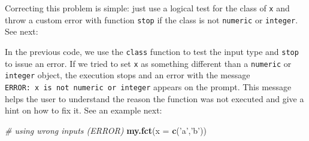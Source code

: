 \documentclass[11pt,]{book}
\newenvironment{Shaded}{\begin{snugshade}}{\end{snugshade}}
\newcommand{\KeywordTok}[1]{\textcolor[rgb]{0.27,0.27,0.27}{\textbf{#1}}}
\newcommand{\DataTypeTok}[1]{\textcolor[rgb]{0.27,0.27,0.27}{#1}}
\newcommand{\DecValTok}[1]{\textcolor[rgb]{0.06,0.06,0.06}{#1}}
\newcommand{\StringTok}[1]{\textcolor[rgb]{0.5,0.5,0.5}{#1}}
\newcommand{\CommentTok}[1]{\textcolor[rgb]{0.56,0.35,0.01}{\textit{#1}}}
\newcommand{\ControlFlowTok}[1]{\textcolor[rgb]{0.13,0.29,0.53}{\textbf{#1}}}
\newcommand{\OperatorTok}[1]{\textcolor[rgb]{0.81,0.36,0.00}{\textbf{#1}}}
\newcommand{\NormalTok}[1]{#1}
\begin{document}
Correcting this problem is simple: just use a logical test for the class
of \texttt{x} and throw a custom error with function \texttt{stop} if
the class is not \texttt{numeric} or \texttt{integer}. See next:

\begin{Shaded}
\end{Shaded}

In the previous code, we use the \texttt{class} function to test the
input type and \texttt{stop} to issue an error. If we tried to set
\texttt{x} as something different than a \texttt{numeric} or
\texttt{integer} object, the execution stops and an error with the
message \texttt{ERROR:\ x\ is\ not\ numeric\ or\ integer} appears on the
prompt. This message helps the user to understand the reason the
function was not executed and give a hint on how to fix it. See an
example next: 

\begin{Shaded}
\begin{Highlighting}[]
\CommentTok{# using wrong inputs (ERROR)}
\KeywordTok{my.fct}\NormalTok{(}\DataTypeTok{x =} \KeywordTok{c}\NormalTok{(}\StringTok{'a'}\NormalTok{,}\StringTok{'b'}\NormalTok{))}
\end{Highlighting}
\end{Shaded}
\end{document}
